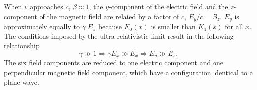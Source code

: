     When $v$ approaches $c$, $\beta \approx 1$, the $y$-component of the 
      electric field and the $z$-component of the magnetic field are related by 
      a factor of $c$, $E_{y}/c=B_{z}$.
    $E_{y}$ is approximately equally to $\gamma$ $E_{x}$ because $K_{0}(x)$ is 
      smaller than $K_{1}(x)$ for all $x$. 
    The conditions imposed by the ultra-relativistic limit result in the 
      following relationship
    \begin{equation} \label{eq:ultraRelAprox}
      \gamma \gg 1 \Rightarrow \gamma E_{x} \gg E_{x} \Rightarrow E_{y} \gg E_{x} \textrm{.}
    \end{equation}
    The six field components are reduced to one electric component and one 
      perpendicular magnetic field component, which have a configuration 
      identical to a plane wave. 

